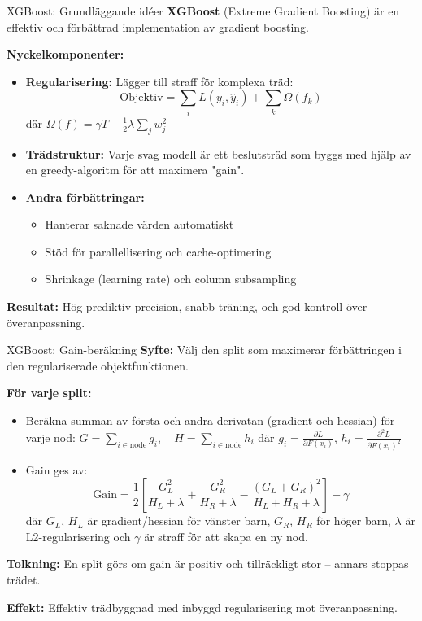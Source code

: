 \documentclass[10pt,english]{beamer}
\begin{document}
\begin{frame}{XGBoost: Grundläggande idéer}
  \textbf{XGBoost} (Extreme Gradient Boosting) är en effektiv och förbättrad implementation av gradient boosting.

  \vspace{0.1cm}
  \textbf{Nyckelkomponenter:}
  \begin{itemize}
    \item \textbf{Regularisering:} Lägger till straff för komplexa träd:
    \[
      \text{Objektiv} = \sum_i L(y_i, \hat{y}_i) + \sum_k \Omega(f_k)
    \]
    där $\Omega(f) = \gamma T + \frac{1}{2} \lambda \sum_j w_j^2$

    \item \textbf{Trädstruktur:} Varje svag modell är ett beslutsträd som byggs med hjälp av en greedy-algoritm för att maximera "gain".

    \item \textbf{Andra förbättringar:}
    \begin{itemize}
      \item Hanterar saknade värden automatiskt
      \item Stöd för parallellisering och cache-optimering
      \item Shrinkage (learning rate) och column subsampling
    \end{itemize}
  \end{itemize}

  \vspace{0.1cm}
  \textbf{Resultat:} Hög prediktiv precision, snabb träning, och god kontroll över överanpassning.
\end{frame}


\begin{frame}{XGBoost: Gain-beräkning}
  \textbf{Syfte:} Välj den split som maximerar förbättringen i den regulariserade objektfunktionen.

  \textbf{För varje split:}
  \begin{itemize}
    \item Beräkna summan av första och andra derivatan (gradient och hessian) för varje nod:
    $G = \sum_{i \in \text{node}} g_i, \quad H = \sum_{i \in \text{node}} h_i$
    där $g_i = \frac{\partial L}{\partial F(x_i)}$, $h_i = \frac{\partial^2 L}{\partial F(x_i)^2}$

    \item Gain ges av:
    \[
      \text{Gain} = \frac{1}{2} \left[ \frac{G_L^2}{H_L + \lambda} + \frac{G_R^2}{H_R + \lambda} - \frac{(G_L + G_R)^2}{H_L + H_R + \lambda} \right] - \gamma
    \]
    där $G_L$, $H_L$ är gradient/hessian för vänster barn, $G_R$, $H_R$ för höger barn, $\lambda$ är L2-regularisering och $\gamma$ är straff för att skapa en ny nod.
  \end{itemize}

  \textbf{Tolkning:} En split görs om gain är positiv och tillräckligt stor – annars stoppas trädet.

  \textbf{Effekt:} Effektiv trädbyggnad med inbyggd regularisering mot överanpassning.
\end{frame}
\end{document}
